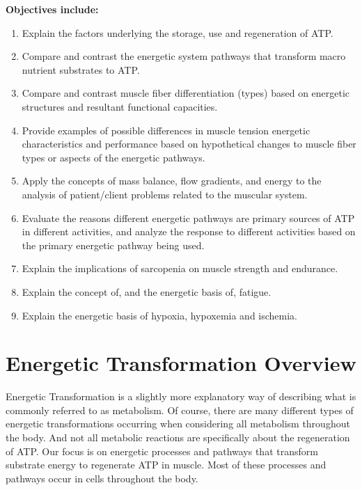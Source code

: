 \vspace{5mm}
\begin{svgraybox}
\textbf{Objectives include:}
\begin{enumerate}
    \item Explain the factors underlying the storage, use and regeneration of ATP.
     \item Compare and contrast the energetic system pathways that transform macro nutrient substrates to ATP.
    \item Compare and contrast muscle fiber differentiation (types) based on energetic structures and resultant functional capacities.
    \item Provide examples of possible differences in muscle tension energetic characteristics and performance based on hypothetical changes to muscle fiber types or aspects of the energetic pathways.
    \item  Apply the concepts of mass balance, flow gradients, and energy to the analysis of patient/client problems related to the muscular system.
     \item Evaluate the reasons different energetic pathways are primary sources of ATP in different activities, and analyze the response to different activities based on the primary energetic pathway being used.
     \item Explain the implications of sarcopenia on muscle strength and endurance.
     \item Explain the concept of, and the energetic basis of, fatigue.
     \item Explain the energetic basis of hypoxia, hypoxemia and ischemia.
\end{enumerate}
\end{svgraybox}
\section{Energetic Transformation Overview}

Energetic Transformation is a slightly more explanatory way of describing what is commonly referred to as metabolism. Of course, there are many different types of energetic transformations occurring when considering all metabolism throughout the body. And not all metabolic reactions are specifically about the regeneration of ATP. Our focus is on energetic processes and pathways that transform substrate energy to regenerate ATP in muscle. Most of these processes and pathways occur in cells throughout the body.

